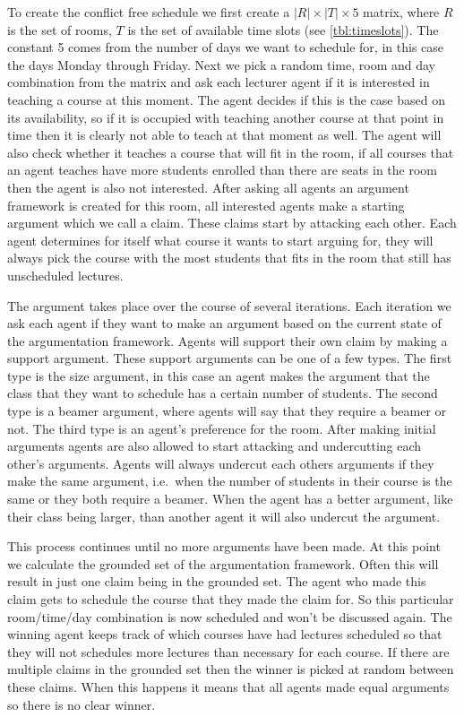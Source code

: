 To create the conflict free schedule we first create a $|R| \times |T| \times
5$ matrix, where $R$ is the set of rooms, $T$ is the set of available time
slots (see \autoref{tbl:timeslots}). The constant 5 comes from the number of
days we want to schedule for, in this case the days Monday through Friday. Next
we pick a random time, room and day combination from the matrix and ask each
lecturer agent if it is interested in teaching a course at this moment. The
agent decides if this is the case based on its availability, so if it is
occupied with teaching another course at that point in time then it is clearly
not able to teach at that moment as well. The agent will also check whether it
teaches a course that will fit in the room, if all courses that an agent teaches
have more students enrolled than there are seats in the room then the agent is
also not interested. After asking all agents an argument framework is created
for this room, all interested agents make a starting argument which we call a
claim. These claims start by attacking each other. Each agent determines for
itself what course it wants to start arguing for, they will always pick the
course with the most students that fits in the room that still has unscheduled
lectures.

The argument takes place over the course of several iterations. Each iteration
we ask each agent if they want to make an argument based on the current state of
the argumentation framework. Agents will support their own claim by making a
support argument. These support arguments can be one of a few types. The first
type is the size argument, in this case an agent makes the argument that the
class that they want to schedule has a certain number of students. The second
type is a beamer argument, where agents will say that they require a beamer or
not. The third type is an agent's preference for the room. After making initial
arguments agents are also allowed to start attacking and undercutting each
other's arguments. Agents will always undercut each others arguments if they
make the same argument, i.e.\ when the number of students in their course is the
same or they both require a beamer. When the agent has a better argument, like
their class being larger, than another agent it will also undercut the argument.

This process continues until no more arguments have been made. At this point we
calculate the grounded set of the argumentation framework. Often this will
result in just one claim being in the grounded set. The agent who made this
claim gets to schedule the course that they made the claim for. So this
particular room/time/day combination is now scheduled and won't be discussed
again. The winning agent keeps track of which courses have had lectures
scheduled so that they will not schedules more lectures than necessary for each
course. If there are multiple claims in the grounded set then the winner is
picked at random between these claims. When this happens it means that all
agents made equal arguments so there is no clear winner.

